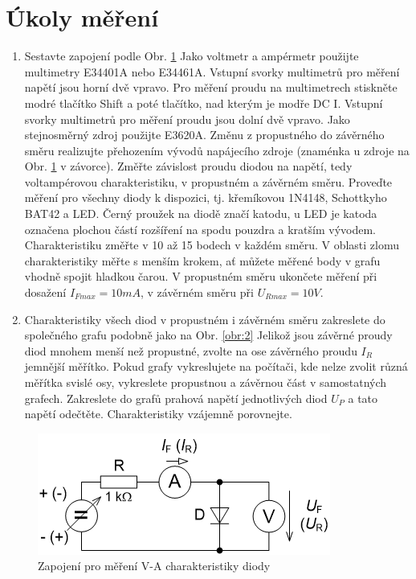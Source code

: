 \documentclass[a4paper, czech]{article}
\begin{document}
\pagebreak

\section[short]{Úkoly měření}
\begin{enumerate}
  \item Sestavte zapojení podle Obr. \ref{obr:3} Jako voltmetr a ampérmetr použijte multimetry E34401A nebo E34461A. Vstupní svorky multimetrů pro měření napětí jsou horní dvě vpravo. Pro měření proudu na multimetrech stiskněte modré tlačítko Shift a poté tlačítko, nad kterým je modře DC I. Vstupní svorky multimetrů pro měření proudu jsou dolní dvě vpravo. Jako stejnosměrný zdroj použijte E3620A. Změnu z propustného do závěrného směru realizujte přehozením vývodů napájecího zdroje (znaménka u zdroje na Obr. \ref*{obr:3} v závorce). Změřte závislost proudu diodou na napětí, tedy voltampérovou charakteristiku, v propustném a závěrném směru. Proveďte měření pro všechny diody k dispozici, tj. křemíkovou 1N4148, Schottkyho BAT42 a LED. Černý proužek na diodě značí katodu, u LED je katoda označena plochou částí rozšíření na spodu pouzdra a kratším vývodem. Charakteristiku změřte v 10 až 15 bodech v každém směru. V oblasti zlomu charakteristiky měřte s menším krokem, ať můžete měřené body v grafu vhodně spojit hladkou čarou. V propustném směru ukončete měření při dosažení $I_{Fmax} = 10 mA$, v závěrném směru při $U_{Rmax} = 10 V$.
  \item Charakteristiky všech diod v propustném i závěrném směru zakreslete do společného grafu podobně jako na Obr. \ref*{obr:2} Jelikož jsou závěrné proudy diod mnohem menší než propustné, zvolte na ose závěrného proudu $I_R$ jemnější měřítko. Pokud grafy vykreslujete na počítači, kde nelze zvolit různá měřítka svislé osy, vykreslete propustnou a závěrnou část v samostatných grafech. Zakreslete do grafů prahová napětí jednotlivých diod $U_P$ a tato napětí odečtěte. Charakteristiky vzájemně porovnejte. 
\end{enumerate}
\begin{figure}[H]
  \centering
  \includegraphics{zapojeni_mereni.png}
  \caption{Zapojení pro měření V-A charakteristiky diody}
  \label{obr:3}
\end{figure}
\end{document}
